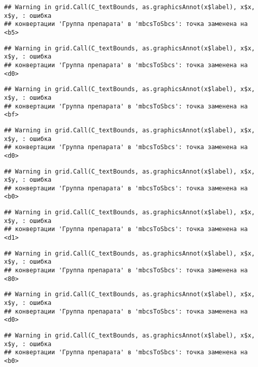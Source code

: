 \documentclass[
]{article}
\begin{document}
\begin{verbatim}
## Warning in grid.Call(C_textBounds, as.graphicsAnnot(x$label), x$x, x$y, : ошибка
## конвертации 'Группа препарата' в 'mbcsToSbcs': точка заменена на <b5>
\end{verbatim}

\begin{verbatim}
## Warning in grid.Call(C_textBounds, as.graphicsAnnot(x$label), x$x, x$y, : ошибка
## конвертации 'Группа препарата' в 'mbcsToSbcs': точка заменена на <d0>
\end{verbatim}

\begin{verbatim}
## Warning in grid.Call(C_textBounds, as.graphicsAnnot(x$label), x$x, x$y, : ошибка
## конвертации 'Группа препарата' в 'mbcsToSbcs': точка заменена на <bf>
\end{verbatim}

\begin{verbatim}
## Warning in grid.Call(C_textBounds, as.graphicsAnnot(x$label), x$x, x$y, : ошибка
## конвертации 'Группа препарата' в 'mbcsToSbcs': точка заменена на <d0>
\end{verbatim}

\begin{verbatim}
## Warning in grid.Call(C_textBounds, as.graphicsAnnot(x$label), x$x, x$y, : ошибка
## конвертации 'Группа препарата' в 'mbcsToSbcs': точка заменена на <b0>
\end{verbatim}

\begin{verbatim}
## Warning in grid.Call(C_textBounds, as.graphicsAnnot(x$label), x$x, x$y, : ошибка
## конвертации 'Группа препарата' в 'mbcsToSbcs': точка заменена на <d1>
\end{verbatim}

\begin{verbatim}
## Warning in grid.Call(C_textBounds, as.graphicsAnnot(x$label), x$x, x$y, : ошибка
## конвертации 'Группа препарата' в 'mbcsToSbcs': точка заменена на <80>
\end{verbatim}

\begin{verbatim}
## Warning in grid.Call(C_textBounds, as.graphicsAnnot(x$label), x$x, x$y, : ошибка
## конвертации 'Группа препарата' в 'mbcsToSbcs': точка заменена на <d0>
\end{verbatim}

\begin{verbatim}
## Warning in grid.Call(C_textBounds, as.graphicsAnnot(x$label), x$x, x$y, : ошибка
## конвертации 'Группа препарата' в 'mbcsToSbcs': точка заменена на <b0>
\end{verbatim}
\end{document}
